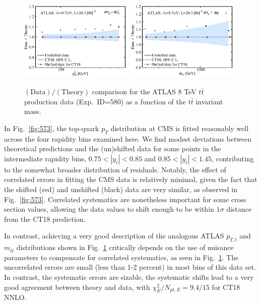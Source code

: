 \begin{figure}[h]
	\includegraphics[width=0.49\textwidth]{./fig/data_580_CT18__1_DoT_ect.pdf}
	\includegraphics[width=0.49\textwidth]{./fig/data_580_CT18__2_DoT_ect.pdf}
	\caption{$(\mathrm{Data})/(\mathrm{Theory})$ comparison for the
	ATLAS 8 TeV $t\bar{t}$ production data (Exp.~ID=580) as a function of the $t\bar t$ invariant mass.}
\label{fig:580}
\end{figure}


In Fig.~\ref{fig:573}, the top-quark $p_T$ distribution at CMS  
is fitted reasonably well across the four rapidity bins examined here. We find
modest deviations between theoretical predictions and the (un)shifted data
for some points in the intermediate rapidity bins, $0.75\! <\! |y_t| \! <\! 0.85$
and $0.85\! <\! |y_t| \! <\! 1.45$, contributing to the somewhat broader
distribution of residuals. Notably, the effect of correlated errors
in fitting the CMS data is relatively minimal, given the fact that the shifted (red) and unshifted (black) data are very similar, as observed in  Fig.~\ref{fig:573}. 
Correlated systematics are nonetheless important for some cross section values, allowing the data values to shift enough to be within 
$1\sigma$ distance from the CT18 prediction.

In contrast, achieving a very good description of the analogous ATLAS 
$p_{T,t}$ and $m_{t\bar{t}}$ distributions shown in Fig.~\ref{fig:580}
critically depends on the use of nuisance parameters to compensate for
correlated systematics, as seen in Fig.~\ref{fig:580}. 
The uncorrelated errors are small (less than 1-2 percent) in most bins of this data set. In contrast, the systematic errors are sizable, the systematic shifts lead to a very good agreement between theory and data, with $\chi^2_E/N_{pt,E}=9.4/15$ for CT18 NNLO.


